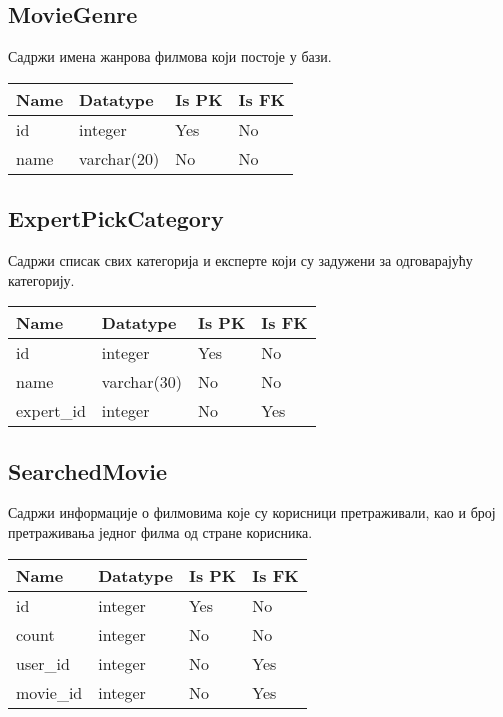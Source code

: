 \subsection{MovieGenre}

Садржи имена жанрова филмова који постоје у бази.

\vspace{0.5cm}

\noindent
\setcellgapes{4pt}
\makegapedcells
\begin{tabularx}{\linewidth}{|X|X|X|X|}
    \hline
    \textbf{Name} & \textbf{Datatype} & \textbf{Is PK} & \textbf{Is FK} \\
    \hline
    id & integer & Yes & No \\
    \hline
    name & varchar(20) & No & No \\
    \hline
\end{tabularx}

\subsection{ExpertPickCategory}

Садржи списак свих категорија и експерте који су задужени за одговарајућу категорију.

\vspace{0.5cm}

\noindent
\setcellgapes{4pt}
\makegapedcells
\begin{tabularx}{\linewidth}{|X|X|X|X|}
    \hline
    \textbf{Name} & \textbf{Datatype} & \textbf{Is PK} & \textbf{Is FK} \\
    \hline
    id & integer & Yes & No \\
    \hline
    name & varchar(30) & No & No \\
    \hline
    expert\_id & integer & No & Yes \\
    \hline
\end{tabularx}

\subsection{SearchedMovie}

Садржи информације о филмовима које су корисници претраживали, као и број претраживања једног филма од стране корисника.

\vspace{0.5cm}

\noindent
\setcellgapes{4pt}
\makegapedcells
\begin{tabularx}{\linewidth}{|X|X|X|X|}
    \hline
    \textbf{Name} & \textbf{Datatype} & \textbf{Is PK} & \textbf{Is FK} \\
    \hline
    id & integer & Yes & No \\
    \hline
    count & integer & No & No \\
    \hline
    user\_id & integer & No & Yes \\
    \hline
    movie\_id & integer & No & Yes \\
    \hline
\end{tabularx}

